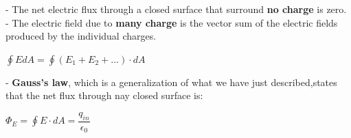 \documentclass[10pt]{article}
\begin{document}
\begin{enumerate}
     - The net electric flux through a closed surface that surround \textbf{no charge} is zero.\\
     - The electric field due to \textbf{many charge} is the vector sum of the electric fields produced by the individual charges.
     \begin{mybox}
     \begin{center}
     $\displaystyle \oint \textbf{$E$} d \textbf{$A$} = \oint (\textbf{$E_1$} + \textbf{$E_2$} + \ldots) \cdot d \textbf{$A$}$
     \end{center}
     \end{mybox}
     - \textbf{Gauss's law}, which is a generalization of what we have just described,states that the net flux through nay closed surface is:
     \begin{mybox}
     \begin{center}
     $\Phi_E = \oint \textbf{$E$} \cdot d\textbf{$A$} = \dfrac{\textbf{$q_{in}$}}{\textbf{$\epsilon_0$}}$
     \end{center}
     \end{mybox}
\end{enumerate} 
\end{document}
